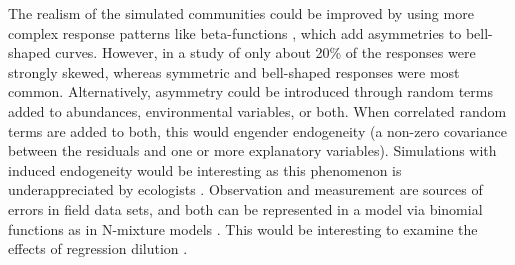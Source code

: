 \documentclass[a4paper,11pt]{article}
\begin{document}
    The realism of the simulated communities could be improved by using more complex response patterns like beta-functions \citep{austin1994determining}, which add asymmetries to bell-shaped curves.
	However, in a study of \citet{Oksanen2002} only about 20\% of the responses were strongly skewed, whereas symmetric and bell-shaped responses were most common. 
	Alternatively, asymmetry could be introduced through random terms added to abundances, environmental variables, or both. \cite[e.g.][]{McCune1997}
	When correlated random terms are added to both, this would engender endogeneity (a non-zero covariance between the residuals and one or more explanatory variables). 
	Simulations with induced endogeneity would be interesting as this phenomenon is underappreciated by ecologists \citep{armsworth2009contrasting, fox2015ecological}.
	Observation and measurement are sources of errors in field data sets, and both can be represented in a model via binomial functions as in N-mixture models \citep{royle2004n}.
    This would be interesting to examine the effects of regression dilution \citep{frost2000correcting, McInerny2011}.
 
\end{document}
